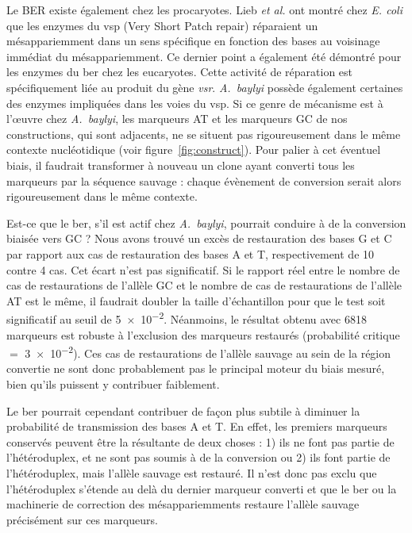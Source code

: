 Le BER existe également chez les procaryotes. Lieb \emph{et
  al.}\cite{lieb_recombination_1985} ont montré chez \emph{E. coli} que les
enzymes du \ac{vsp} (Very Short Patch repair) réparaient un mésappariemment
dans un sens spécifique en fonction des bases au voisinage immédiat du
mésappariemment. Ce dernier point a également été démontré pour les enzymes du
\ac{ber} chez les eucaryotes\cite{brown_different_1988}. Cette activité de
réparation est spécifiquement liée au produit du gène
\emph{vsr}\cite{hennecke_vsr_1991,lieb_specific_1983}. \emph{A.~baylyi} possède
également certaines des enzymes impliquées dans les voies du
\ac{vsp}\cite{kanehisa_kegg_2016}. Si ce genre de mécanisme est à l'œuvre chez
\emph{A.~baylyi}, les marqueurs AT et les marqueurs GC de nos constructions, qui
sont adjacents, ne se situent pas rigoureusement dans le même contexte
nucléotidique (voir figure~\ref{fig:construct}). Pour palier à cet éventuel
biais, il faudrait transformer à nouveau un clone ayant converti tous les
marqueurs par la séquence sauvage : chaque évènement de conversion serait alors
rigoureusement dans le même contexte.

Est-ce que le \ac{ber}, s'il est actif chez \emph{A.~baylyi}, pourrait conduire
à de la conversion biaisée vers GC ? Nous avons trouvé un excès de restauration
des bases G et C par rapport aux cas de restauration des bases A et T,
respectivement de 10 contre 4 cas. Cet écart n'est pas significatif. Si le
rapport réel entre le nombre de cas de restaurations de l'allèle GC et le nombre
de cas de restaurations de l'allèle AT est le même, il faudrait doubler la
taille d'échantillon pour que le test soit significatif au seuil de \num{5e-2}.
Néanmoins, le résultat obtenu avec \num{6818} marqueurs est robuste à
l'exclusion des marqueurs restaurés (probabilité critique \(=\) \num{3e-2}). Ces
cas de restaurations de l'allèle sauvage au sein de la région convertie ne sont
donc probablement pas le principal moteur du biais mesuré, bien qu'ils puissent
y contribuer faiblement.

Le \ac{ber} pourrait cependant contribuer de façon plus subtile à diminuer la
probabilité de transmission des bases A et T. En effet, les premiers marqueurs
conservés peuvent être la résultante de deux choses : 1) ils ne font pas partie
de l'hétéroduplex, et ne sont pas soumis à de la conversion ou 2) ils font
partie de l'hétéroduplex, mais l'allèle sauvage est restauré. Il n'est donc pas
exclu que l'hétéroduplex s'étende au delà du dernier marqueur converti et que le
\ac{ber} ou la machinerie de correction des mésappariemments restaure l'allèle
sauvage précisément sur ces marqueurs.

